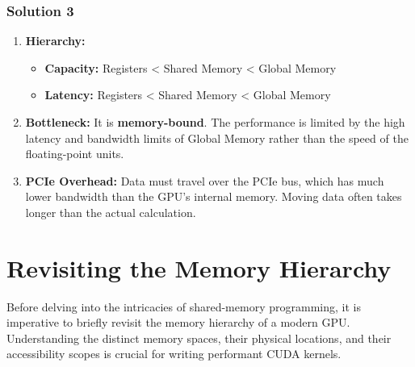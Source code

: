 \subsubsection{Solution 3}
\begin{enumerate}[label=(\alph*)]
\item \textbf{Hierarchy:}
\begin{itemize}
\item \textbf{Capacity:} Registers < Shared Memory < Global Memory
\item \textbf{Latency:} Registers < Shared Memory < Global Memory
\end{itemize}
\item \textbf{Bottleneck:} It is \textbf{memory-bound}. The performance is limited by the high latency and bandwidth limits of Global Memory rather than the speed of the floating-point units.
\item \textbf{PCIe Overhead:} Data must travel over the PCIe bus, which has much lower bandwidth than the GPU's internal memory. Moving data often takes longer than the actual calculation.
\end{enumerate}
\newpage
\section{Revisiting the Memory Hierarchy}
\label{sec:memory-hierarchy}

Before delving into the intricacies of shared-memory programming, it is imperative to briefly revisit the memory hierarchy of a modern GPU. Understanding the distinct memory spaces, their physical locations, and their accessibility scopes is crucial for writing performant CUDA kernels.


